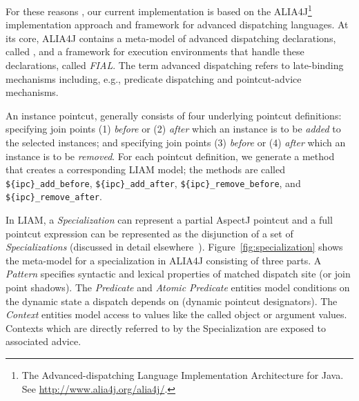 \documentclass{acm_proc_article-sp}
\begin{document}
For these reasons , our current implementation is based on the ALIA4J\footnote{The Advanced-dispatching Language Implementation Architecture for Java. See \url{http://www.alia4j.org/alia4j/}.}~\cite{Bockisch2012,Bockisch2011} implementation approach and framework for advanced dispatching languages.
At its core, ALIA4J contains a meta-model of advanced dispatching declarations, called \emph{\LIAM}, and a framework for execution environments that handle these declarations, called \emph{FIAL}.
The term advanced dispatching refers to late-binding mechanisms including, e.g., predicate dispatching and pointcut-advice mechanisms.

An instance pointcut, generally consists of four underlying pointcut definitions: specifying join points (1) \emph{before} or (2) \emph{after} which an instance is to be \emph{added} to the selected instances; and specifying join points (3) \emph{before} or (4) \emph{after} which an instance is to be \emph{removed}.
For each pointcut definition, we generate a method that creates a corresponding LIAM model; the methods are called \lstinline!${ipc}_add_before!, \lstinline!${ipc}_add_after!, \lstinline!${ipc}_remove_before!, and \lstinline!${ipc}_remove_after!.

In LIAM, a \emph{Specialization} can represent a partial AspectJ pointcut and a full pointcut expression can be represented as the disjunction of a set of \emph{Specializations} (discussed in detail elsewhere~\cite{Bockisch2007}). 
Figure~\ref{fig:specialization} shows the meta-model for a specialization in ALIA4J consisting of three parts.
A \emph{Pattern} specifies syntactic and lexical properties of matched dispatch site (or join point shadows).
The \emph{Predicate} and \emph{Atomic Predicate} entities model conditions on the dynamic state a dispatch depends on (dynamic pointcut designators).
The \emph{Context} entities model access to values like the called object or argument values.
Contexts which are directly referred to by the Specialization are exposed to associated advice.
\end{document}
